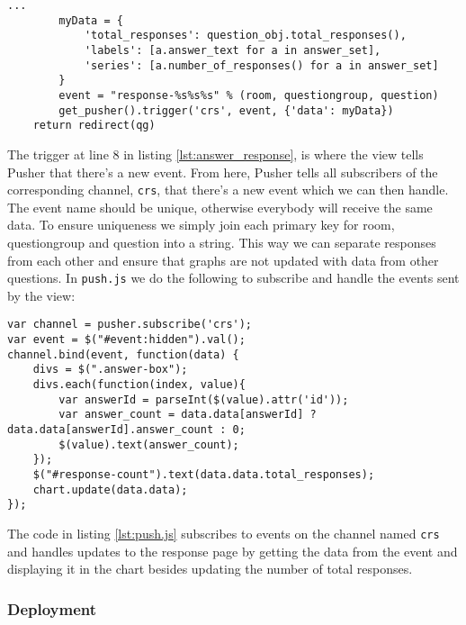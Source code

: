 \begin{lstlisting}[caption=Selected parts of the answer\_response view, label=lst:answer_response]
        ...
        myData = {
            'total_responses': question_obj.total_responses(),
            'labels': [a.answer_text for a in answer_set],
            'series': [a.number_of_responses() for a in answer_set]
        }
        event = "response-%s%s%s" % (room, questiongroup, question)
        get_pusher().trigger('crs', event, {'data': myData})
    return redirect(qg)
\end{lstlisting}

The trigger at line 8 in listing \ref{lst:answer_response}, is where the view tells Pusher that there's a new event. From here, Pusher tells all subscribers of the corresponding channel, \texttt{crs}, that there's a new event which we can then handle. The event name should be unique, otherwise everybody will receive the same data. To ensure uniqueness we simply join each primary key for room, questiongroup and question into a string. This way we can separate responses from each other and ensure that graphs are not updated with data from other questions.
In \texttt{push.js} we do the following to subscribe and handle the events sent by the view:

\begin{lstlisting}[caption=Selected parts of push.js, label=lst:push.js]
var channel = pusher.subscribe('crs');
var event = $("#event:hidden").val();
channel.bind(event, function(data) {
    divs = $(".answer-box");
    divs.each(function(index, value){
        var answerId = parseInt($(value).attr('id'));
        var answer_count = data.data[answerId] ? data.data[answerId].answer_count : 0;
        $(value).text(answer_count);
    });
    $("#response-count").text(data.data.total_responses);
    chart.update(data.data);
});
\end{lstlisting}
The code in listing \ref{lst:push.js} subscribes to events on the channel named \texttt{crs} and handles updates to the response page by getting the data from the event and displaying it in the chart besides updating the number of total responses.


\subsubsection*{Deployment}

